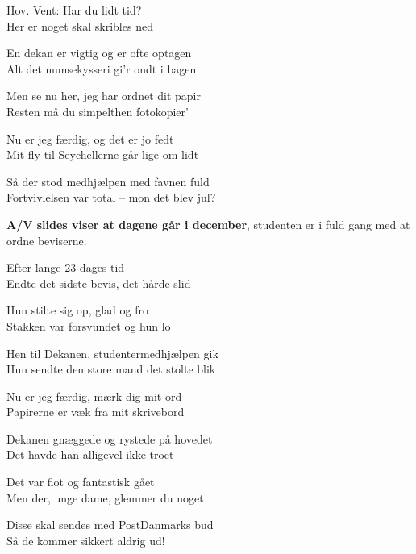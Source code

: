 \documentclass[a4paper,12pt]{article}
\begin{document}
\begin{sketch}
Hov. Vent: Har du lidt tid?\\
Her er noget skal skribles ned

En dekan er vigtig og er ofte optagen\\
Alt det numsekysseri gi'r ondt i bagen

Men se nu her, jeg har ordnet dit papir\\
Resten må du simpelthen fotokopier'

Nu er jeg færdig, og det er jo fedt\\
Mit fly til Seychellerne går lige om lidt

Så der stod medhjælpen med favnen fuld\\
Fortvivlelsen var total -- mon det blev jul?

\scene \textbf{A/V slides viser at dagene går i december}, studenten er i fuld gang med at ordne beviserne.

Efter lange 23 dages tid\\
Endte det sidste bevis, det hårde slid

Hun stilte sig op, glad og fro\\
Stakken var forsvundet og hun lo

Hen til Dekanen, studentermedhjælpen gik\\
Hun sendte den store mand det stolte blik

Nu er jeg færdig, mærk dig mit ord\\
Papirerne er væk fra mit skrivebord

Dekanen gnæggede og rystede på hovedet\\
Det havde han alligevel ikke troet

Det var flot og fantastisk gået\\
Men der, unge dame, glemmer du noget

Disse skal sendes med PostDanmarks bud\\
Så de kommer sikkert aldrig ud!


\end{sketch}
\end{document}
